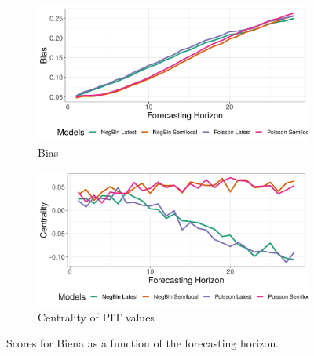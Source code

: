 \begin{figure}[H]
\begin{subfigure}{0.5\textwidth}
  \centering
  \includegraphics[width=\linewidth]{../output/Biena_bias.png}  
  \caption{Bias}
  \label{fig:Biena_scores_3}
\end{subfigure}
\begin{subfigure}{0.5\textwidth}
  \centering
  \includegraphics[width=\linewidth]{../output/Biena_centrality.png}  
  \caption{Centrality of PIT values}
  \label{fig:Biena_scores_4}
\end{subfigure}
  \caption{Scores for Biena as a function of the forecasting horizon.}

  \label{fig:nat_scores}
\end{figure}
